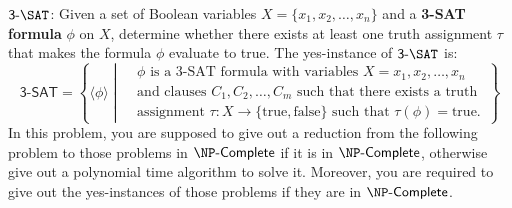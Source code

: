 $\sat{3}$: Given a set of Boolean variables $X = \{x_1, x_2, \ldots, x_n\}$ and a \textbf{3-SAT formula} $\phi$ on $X$, determine whether there exists at least one truth assignment $\tau$ that makes the formula $\phi$ evaluate to true. The yes-instance of $\sat{3}$ is:
\begin{equation*}
\mathsf{3\text{-}SAT} = 
\left\{\langle{\phi\rangle} \middle| 
\begin{aligned}
& \phi \text{ is a 3-SAT formula with variables } X = {x_1, x_2, \ldots, x_n}\\
&\text{and clauses } C_1, C_2, \ldots, C_m \text{ such that there exists} \text{ a truth } \\
& \text{assignment }\tau: X \rightarrow \{\text{true}, \text{false}\}\text{ such that } \tau(\phi) = \text{true}.
\end{aligned}
\right\}
\end{equation*}
In this problem, you are supposed to give out a reduction from the following problem to those problems in $\complete{\NP}$ if it is in $\complete{\NP}$, otherwise give out a polynomial time algorithm to solve it. Moreover, you are required to give out the yes-instances of those problems if they are in $\complete{\NP}$.

